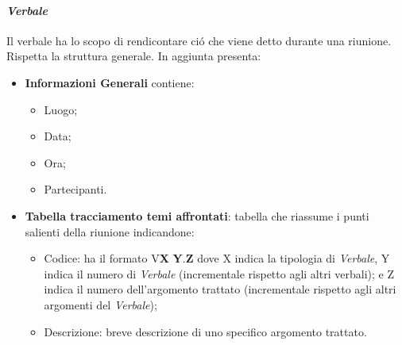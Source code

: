 \paragraph{\textit{Verbale}}
Il verbale ha lo scopo di rendicontare ció che viene detto durante una riunione.
Rispetta la struttura generale.
In aggiunta presenta:
\begin{itemize} 
    \item \textbf{Informazioni Generali}
    contiene:
    \begin{itemize} 
        \item Luogo;
        \item Data;
        \item Ora;
        \item Partecipanti.
    \end{itemize}
\item \textbf{Tabella tracciamento temi affrontati}:
tabella che riassume i punti salienti della riunione indicandone:
    \begin{itemize} 
        \item Codice: ha il formato V\textbf{X} \textbf{Y}.\textbf{Z} dove X indica la tipologia di \textit{Verbale}, Y indica il numero di \textit{Verbale} (incrementale rispetto agli altri verbali);
        e Z indica il numero dell'argomento trattato (incrementale rispetto agli altri argomenti del \textit{Verbale});
        \item Descrizione: breve descrizione di uno specifico argomento trattato.
    \end{itemize}
\end{itemize}